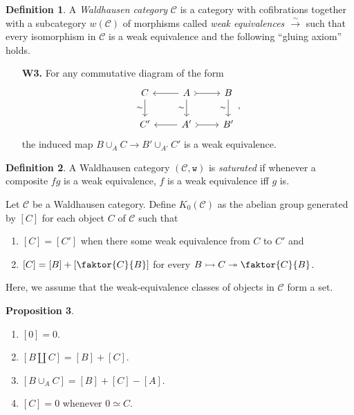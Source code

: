 \documentclass[10pt,letterpaper,cm]{nupset}
\theoremstyle{definition}
\newtheorem{definition}{Definition}[section]
\theoremstyle{theorem}
\newtheorem{prop}[definition]{Proposition}
\theoremstyle{remark}
\newcommand{\1}{\mathbf{1}}
\renewcommand{\c}{\mathscr{C}}
\newcommand{\0}{\vec 0}
\begin{document}
\begin{definition}
A \textit{Waldhausen category} $\c$ is a category with cofibrations together with a subcategory $w(\c)$ of morphisms called \textit{weak equivalences $\overset{\sim}{\longrightarrow}$} such that every isomorphism in $\c$ is a weak equivalence and the following ``gluing axiom'' holds.
\begin{itemize}
\item[\textbf{W3.}] For any commutative diagram of the form
\[
\begin{tikzcd}
C \arrow[d, "\sim"'] & A \arrow[d, "\sim"'] \arrow[r, tail] \arrow[l] & B \arrow[d, "\sim"'] \\
C' & A' \arrow[r, tail] \arrow[l] & B'
\end{tikzcd}, \]
the induced map $B \cup_A C \to  B' \cup_{A'} C'$ is a weak equivalence.
\end{itemize}
\end{definition}

\begin{definition}
A Waldhausen category $\left(\c, \mathtt{w}\right)$ is \textit{saturated} if whenever a composite $fg$ is a weak equivalence, $f$ is a weak equivalence iff $g$ is. 
\end{definition}

\smallskip

Let $\c$ be a Waldhausen category. Define $K_0(\c)$ as the abelian group generated by $\left[C\right]$ for each object $C$ of $\c$ such that
\begin{enumerate}
\item $\left[C\right] = \left[C'\right]$ when there some weak equivalence from $C$ to $C'$ and
\item $\left[C\right] = \left[B\right] + \left[\faktor{C}{B}\right]$ for every $B \rightarrowtail  C \twoheadrightarrow \faktor{C}{B}$.
\end{enumerate}

Here, we assume that the weak-equivalence classes of objects in $\c$ form a set.


\begin{prop} $ $
\begin{enumerate}
\item $\left[0\right] = 0$.
\item $\left[B \coprod C\right] = \left[B\right] +\left[C\right]$.
\item $\left[B \cup_A C\right] = \left[B\right]+\left[C\right]-\left[A\right]$.
\item $\left[C\right]= 0$ whenever $0 \simeq C$.
\end{enumerate}
\end{prop}
\end{document}
